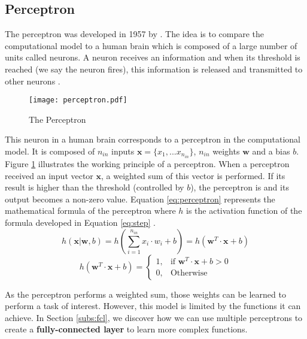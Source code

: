 \subsection{Perceptron} \label{subs:perceptron}
The perceptron was developed in 1957 by \textcite{rosenblatt_perceptron_1958}. The idea is to compare the computational model to a human brain which is composed of a large number of units called neurons. A neuron receives an information and when its threshold is reached (we say the neuron fires), this information is released and transmitted to other neurons \cite{rosenblatt_perceptron_1958, matteucci_artificial_2019}.

\begin{figure}
    \centering
    \texttt{[image: perceptron.pdf]}
    \caption{The Perceptron}
    \label{fig:perceptron}
\end{figure}
%
This neuron in a human brain corresponds to a perceptron in the computational model. It is composed of $n_{in}$ inputs $\boldsymbol{x} = \{ x_1, ... x_{n_{in}} \}$, $n_{in}$ weights $\boldsymbol{w}$ and a bias $b$. Figure \ref{fig:perceptron} illustrates the working principle of a perceptron. When a perceptron received an input vector $\boldsymbol{x}$, a weighted sum of this vector is performed. If its result is higher than the threshold (controlled by $b$), the perceptron is  and its output becomes a non-zero value.
Equation \ref{eq:perceptron} represents the mathematical formula of the perceptron where $h$ is the activation function of the formula developed in Equation \ref{eq:step} \cite{matteucci_artificial_2019}.
%
\begin{equation}
    h ( \boldsymbol{x} | \boldsymbol{w}, b) = h \left( \sum^{n_{in}}_{i=1} x_i \cdot w_i + b \right) = h \left( \boldsymbol{w}^{T} \cdot \boldsymbol{x} + b \right)
    \label{eq:perceptron}
\end{equation}
%
\begin{equation}
    h ( \boldsymbol{w}^{T} \cdot \boldsymbol{x} + b) = \begin{cases} 1, & \mbox{if } \boldsymbol{w}^{T} \cdot \boldsymbol{x} + b > 0 \\ 0, & \mbox{Otherwise} \end{cases}
    \label{eq:step}
\end{equation}

As the perceptron performs a weighted sum, those weights can be learned to perform a task of interest. However, this model is limited by the functions it can achieve. In Section \ref{subs:fcl}, we discover how we can use multiple perceptrons to create a \textbf{fully-connected layer} to learn more complex functions.
